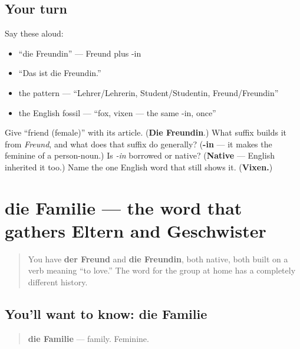 \subsection*{Your turn}
Say these aloud:

\begin{itemize}
\raggedright
  \item \textquotedblleft{}die Freundin\textquotedblright{} — Freund plus -in
  \item \textquotedblleft{}Das ist die Freundin.\textquotedblright{}
  \item the pattern — \textquotedblleft{}Lehrer/Lehrerin, Student/Studentin, Freund/Freundin\textquotedblright{}
  \item the English fossil — \textquotedblleft{}fox, vixen — the same -in, once\textquotedblright{}
\end{itemize}

\begin{tcolorbox}[breakable,colback=teal!4,colframe=teal!35!black,title={Before you move on}]
Give \textquotedblleft{}friend (female)\textquotedblright{} with its article. (\textbf{Die Freundin}.) What suffix builds it from \emph{Freund}, and what does that suffix do generally? (\textbf{-in} — it makes the feminine of a person-noun.) Is \emph{-in} borrowed or native? (\textbf{Native} — English inherited it too.) Name the one English word that still shows it. (\textbf{Vixen.})
\end{tcolorbox}
\section[die Familie]{die Familie — the word that gathers Eltern and Geschwister}

\label{lesson:GE-C29-familie}



\begin{quote}
You have \textbf{der Freund} and \textbf{die Freundin}, both native, both built on a verb meaning \textquotedblleft{}to love.\textquotedblright{} The word for the group at home has a completely different history.
\end{quote}

\subsection*{You'll want to know: die Familie}
\begin{quote}
\textbf{die Familie} — family. Feminine.
\end{quote}

